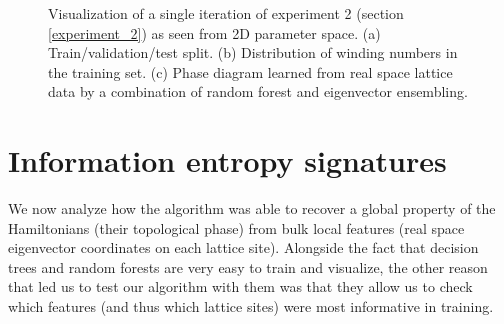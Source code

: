 \documentclass[10pt]{revtex4-1}
\begin{document}
\begin{figure}
\centering
{}\quad
{}
\caption{Visualization of a single iteration of experiment 2 (section \ref{experiment_2}) as seen from 2D parameter space. (a) Train/validation/test split. (b) Distribution of winding numbers in the training set. (c) Phase diagram learned from real space lattice data by a combination of random forest and eigenvector ensembling.}
\label{figexp2_exp}
\end{figure}

\section{Information entropy signatures}
\label{information_entropy_signatures}

We now analyze how the algorithm was able to recover a global property of the Hamiltonians (their topological phase) from bulk local features (real space eigenvector coordinates on each lattice site). Alongside the fact that decision trees and random forests are very easy to train and visualize, the other reason that led us to test our algorithm with them was that they allow us to check which features (and thus which lattice sites) were most informative in training.
\end{document}
